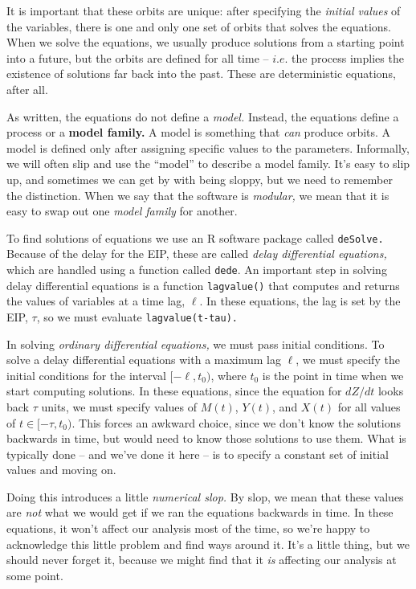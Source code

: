 \documentclass[
]{book}
\begin{document}
It is important that these orbits are unique: after specifying the \emph{initial values} of the variables, there is one and only one set of orbits that solves the equations. When we solve the equations, we usually produce solutions from a starting point into a future, but the orbits are defined for all time -- \(i.e.\) the process implies the existence of solutions far back into the past. These are deterministic equations, after all.

As written, the equations do not define a \emph{model.} Instead, the equations define a process or a \textbf{model family.} A model is something that \emph{can} produce orbits. A model is defined only after assigning specific values to the parameters. Informally, we will often slip and use the ``model'' to describe a model family. It's easy to slip up, and sometimes we can get by with being sloppy, but we need to remember the distinction. When we say that the software is \emph{modular,} we mean that it is easy to swap out one \emph{model family} for another.

To find solutions of equations we use an R software package called \texttt{deSolve.} Because of the delay for the EIP, these are called \emph{delay differential equations,} which are handled using a function called \texttt{dede}. An important step in solving delay differential equations is a function \texttt{lagvalue()} that computes and returns the values of variables at a time lag, \(\ell\). In these equations, the lag is set by the EIP, \(\tau\), so we must evaluate
\texttt{lagvalue(t-tau).}

In solving \emph{ordinary differential equations,} we must pass initial conditions. To solve a delay differential equations with a maximum lag \(\ell\), we must specify the initial conditions for the interval \([-\ell, t_0)\), where \(t_0\) is the point in time when we start computing solutions.
In these equations, since the equation for \(dZ/dt\) looks back \(\tau\) units, we must specify values of \(M(t)\), \(Y(t)\), and \(X(t)\) for all values of \(t \in [-\tau, t_0)\). This forces an awkward choice, since we don't know the solutions backwards in time, but would need to know those solutions to use them. What is typically done -- and we've done it here -- is to specify a constant set of initial values and moving on.

Doing this introduces a little \emph{numerical slop.} By slop, we mean that these values are \emph{not} what we would get if we ran the equations backwards in time. In these equations, it won't affect our analysis most of the time, so we're happy to acknowledge this little problem and find ways around it. It's a little thing, but we should never forget it, because we might find that it \emph{is} affecting our analysis at some point.
\end{document}
